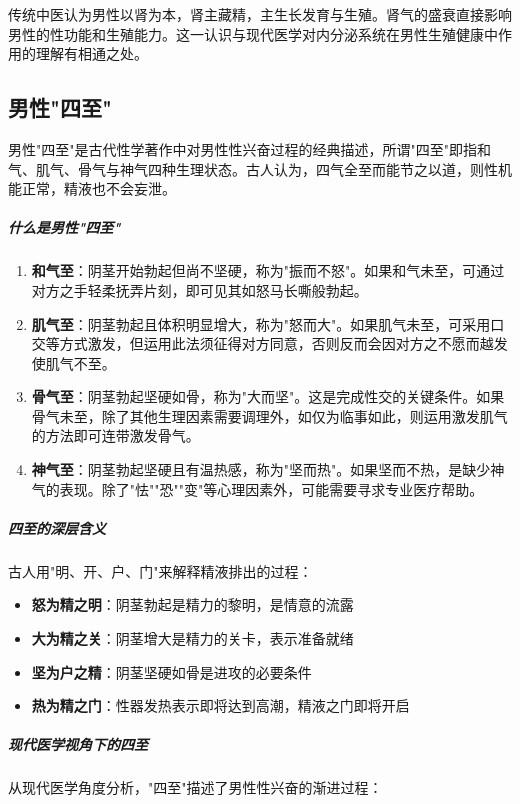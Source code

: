 传统中医认为男性以肾为本，肾主藏精，主生长发育与生殖。肾气的盛衰直接影响男性的性功能和生殖能力。这一认识与现代医学对内分泌系统在男性生殖健康中作用的理解有相通之处。

\subsection{男性"四至"}

男性"四至"是古代性学著作中对男性性兴奋过程的经典描述，所谓"四至"即指和气、肌气、骨气与神气四种生理状态。古人认为，四气全至而能节之以道，则性机能正常，精液也不会妄泄。

\subparagraph{什么是男性"四至"}

\begin{enumerate}
    \item \textbf{和气至}：阴茎开始勃起但尚不坚硬，称为"振而不怒"。如果和气未至，可通过对方之手轻柔抚弄片刻，即可见其如怒马长嘶般勃起。
    
    \item \textbf{肌气至}：阴茎勃起且体积明显增大，称为"怒而大"。如果肌气未至，可采用口交等方式激发，但运用此法须征得对方同意，否则反而会因对方之不愿而越发使肌气不至。
    
    \item \textbf{骨气至}：阴茎勃起坚硬如骨，称为"大而坚"。这是完成性交的关键条件。如果骨气未至，除了其他生理因素需要调理外，如仅为临事如此，则运用激发肌气的方法即可连带激发骨气。
    
    \item \textbf{神气至}：阴茎勃起坚硬且有温热感，称为"坚而热"。如果坚而不热，是缺少神气的表现。除了"怯""恐""变"等心理因素外，可能需要寻求专业医疗帮助。
\end{enumerate}

\subparagraph{四至的深层含义}

古人用"明、开、户、门"来解释精液排出的过程：
\begin{itemize}
    \item \textbf{怒为精之明}：阴茎勃起是精力的黎明，是情意的流露
    \item \textbf{大为精之关}：阴茎增大是精力的关卡，表示准备就绪
    \item \textbf{坚为户之精}：阴茎坚硬如骨是进攻的必要条件
    \item \textbf{热为精之门}：性器发热表示即将达到高潮，精液之门即将开启
\end{itemize}

\subparagraph{现代医学视角下的四至}

从现代医学角度分析，"四至"描述了男性性兴奋的渐进过程：

